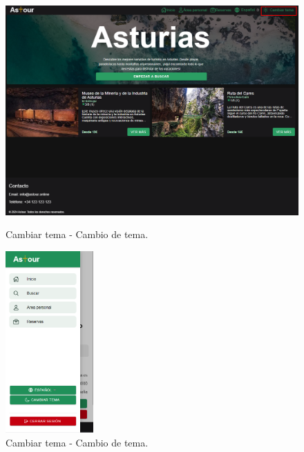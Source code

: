\begin{figure}[H]
	\centering
	\begin{minipage}{0.45\textwidth}
		\centering
		\includegraphics[width=1\textwidth]{7-Construccion/Manuales/web/tema.png}
		\caption{Cambiar tema - Cambio de tema.}
		\label{fig:tema-web}
	\end{minipage}
	\hfill
	\begin{minipage}{0.45\textwidth}
		\centering
		\includegraphics[width=0.3\textwidth]{7-Construccion/Manuales/mobile/tema claro.png}
		\caption{Cambiar tema - Cambio de tema.}
		\label{fig:cambio-tema}
	\end{minipage}
\end{figure}

